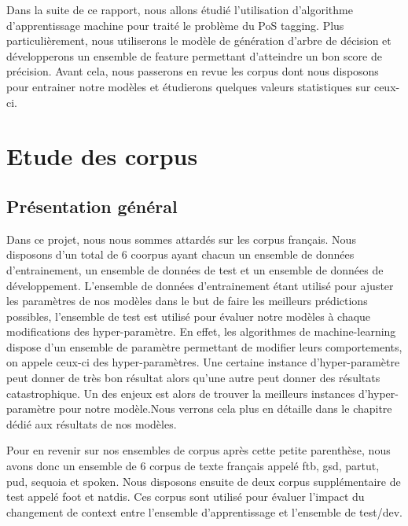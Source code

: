 \documentclass[french, 14pt]{memoir}
\begin{document}
Dans la suite de ce rapport, nous allons étudié l'utilisation d'algorithme d'apprentissage machine pour traité le problème du PoS tagging. Plus particulièrement, nous utiliserons le modèle de génération d'arbre de décision et développerons un ensemble de feature permettant d'atteindre un bon score de précision. 
Avant cela, nous passerons en revue les corpus dont nous disposons pour entrainer notre modèles et étudierons quelques valeurs statistiques sur ceux-ci. 

\chapter{Etude des corpus}
\section{Présentation général}
Dans ce projet, nous nous sommes attardés sur les corpus français. Nous disposons d'un total de 6 coorpus ayant chacun un ensemble de données d'entrainement, un ensemble de données de test et un ensemble de données de développement. L'ensemble de données d'entrainement étant utilisé pour ajuster les paramètres de nos modèles dans le but de faire les meilleurs prédictions possibles, l'ensemble de test est utilisé pour évaluer notre modèles à chaque modifications des hyper-paramètre. En effet, les algorithmes de machine-learning dispose d'un ensemble de paramètre permettant de modifier leurs comportements, on appele ceux-ci des hyper-paramètres. Une certaine instance d'hyper-paramètre peut donner de très bon résultat alors qu'une autre peut donner des résultats catastrophique.
Un des enjeux est alors de trouver la meilleurs instances d'hyper-paramètre pour notre modèle.Nous verrons cela plus en détaille dans le chapitre dédié aux résultats de nos modèles.

Pour en revenir sur nos ensembles de corpus après cette petite parenthèse, nous avons donc un ensemble de 6 corpus de texte français appelé ftb, gsd, partut, pud, sequoia et spoken. Nous disposons ensuite de deux corpus supplémentaire de test appelé foot et natdis. Ces corpus sont utilisé pour évaluer l'impact du changement de context entre l'ensemble d'apprentissage et l'ensemble de test/dev.
\end{document}
